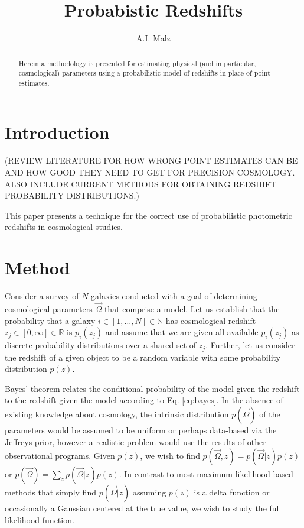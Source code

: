 \documentclass[12pt, onecolumn]{emulateapj}
\begin{document}
\title{Probabistic Redshifts}

\author{A.I. Malz}

\begin{abstract}
Herein a methodology is presented for estimating physical (and in particular, cosmological) parameters using a probabilistic model of redshifts in place of point estimates.  
\end{abstract}


\section{Introduction}

(REVIEW LITERATURE FOR HOW WRONG POINT ESTIMATES CAN BE AND HOW GOOD THEY NEED TO GET FOR PRECISION COSMOLOGY.  ALSO INCLUDE CURRENT METHODS FOR OBTAINING REDSHIFT PROBABILITY DISTRIBUTIONS.)

This paper presents a technique for the correct use of probabilistic photometric redshifts in cosmological studies. 

\section{Method}

Consider a survey of $N$ galaxies conducted with a goal of determining cosmological parameters $\vec{\Omega}$ that comprise a model.  Let us establish that the probability that a galaxy $i\in[1,\dots,N]\in\mathbb{N}$ has cosmological redshift $z_{j}\in[0,\infty]\in\mathbb{R}$ is $p_{i}(z_{j})$ and assume that we are given all available $p_{i}(z_{j})$ as discrete probability distributions over a shared set of $z_{j}$.  Further, let us consider the redshift of a given object to be a random variable with some probability distribution $p(z)$.  

Bayes' theorem relates the conditional probability of the model given the redshift to the redshift given the model according to Eq. \ref{eq:bayes}.  In the absence of existing knowledge about cosmology, the intrinsic distribution $p(\vec{\Omega})$ of the parameters would be assumed to be uniform or perhaps data-based via the Jeffreys prior, however a realistic problem would use the results of other observational programs.  Given $p(z)$, we wish to find $p(\vec{\Omega},z)=p(\vec{\Omega}|z)p(z)$ or $p(\vec{\Omega})=\sum_{z}p(\vec{\Omega}|z)p(z)$.  In contrast to most maximum likelihood-based methods that simply find $p(\vec{\Omega}|z)$ assuming $p(z)$ is a delta function or occasionally a Gaussian centered at the true value, we wish to study the full likelihood function.
\end{document}
